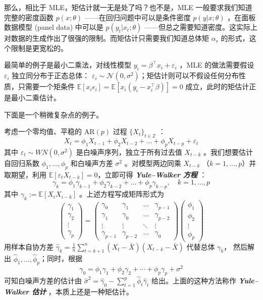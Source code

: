 \begin{remark}
那么，相比于 MLE，矩估计就一无是处了吗？也不是，MLE 一般要求我们知道完整的密度函数 $p(x;\theta)$ ------在回归问题中可以是条件密度 $p(y|x;\theta)$ ，在面板数据模型 (panel data) 中可以是 $p(y_t|x_t;\theta)$ ------但总之需要知道密度。这实际上对数据的生成作出了很强的限制。而矩估计只需要我们知道总体矩 $\alpha_r$ 的形式，这个限制是更宽松的。

最简单的例子是最小二乘法，对线性模型 $y_i=\beta^\top x_i+\varepsilon_i$ ，MLE 的做法需要假设 $\varepsilon_i$ 独立同分布于正态总体： $\varepsilon_i \sim \mathcal{N}(0,\sigma^2)$；矩估计则可以不假设任何分布性质，只需要一个矩条件 $\mathbb{E}[x_i\epsilon_i]=\mathbb{E}[x_i(y_i-x_i^\top\beta)]=0$ 成立，此时的矩估计正是最小二乘估计。%


下面是一个稍微复杂点的例子。

\begin{example}
考虑一个零均值、平稳的 $\mathrm{AR}(p)$ 过程 $\{X_t\}_{t\in\mathbb Z}$ ：
\[X_t = \phi_1 X_{t-1} + \phi_2 X_{t-2} + \dots + \phi_p X_{t-p} + \varepsilon_t\]
其中 $\varepsilon_t\sim WN(0,\sigma^2)$ 是白噪声序列，独立于所有过去值 $X_{t-k}$ 。我们想要估计自回归系数 $\phi_1, \dots, \phi_p$ 和白噪声方差 $\sigma^2$ 。对模型两边同乘 $X_{t-k}$ （$k=1,\dots,p$）并取期望，利用 $\mathbb{E}[\varepsilon_t X_{t-k}] = 0$，立即可得 \textbf{\emph{Yule--Walker 方程}} ：
\[ \gamma_k = \phi_1 \gamma_{k-1} + \phi_2 \gamma_{k-2} + \dots + \phi_p \gamma_{k-p}, \quad k=1,\dots,p \]其中 $\gamma_k:=\mathbb{E}[X_iX_{i-k}]$ 。上述方程写成矩阵形式为
\[\begin{pmatrix} \gamma_1 \\ \gamma_2 \\ \vdots \\ \gamma_p \end{pmatrix} = \begin{pmatrix} \gamma_0 & \gamma_1 & \dots & \gamma_{p-1} \\ \gamma_1 & \gamma_0 & \dots & \gamma_{p-2} \\ \vdots & \vdots & \ddots & \vdots \\ \gamma_{p-1} & \gamma_{p-2} & \dots & \gamma_0 \end{pmatrix} \begin{pmatrix} \phi_1 \\ \phi_2 \\ \vdots \\ \phi_p \end{pmatrix}\]
用样本自协方差 $\widehat{\gamma}_k = \frac{1}{n}\sum_{t=k+1}^n (X_t - \bar{X})(X_{t-k} - \bar{X})$ 代替总体 $\gamma_k$， 然后解出 $\widehat{\phi}_1,\dots,\widehat{\phi}_p$；同时，根据
\[\gamma_0=\phi_1\gamma_1+\phi_2\gamma_2+\cdots+\phi_p\gamma_p+\sigma^2\]
可知白噪声方差的估计由 $\widehat\sigma^2=\widehat\gamma_0-\sum_{t=1}^p\widehat\phi_t\widehat \gamma_t$ 给出。上面的这种方法称作 \textbf{\emph{Yule--Walker 估计}} ，本质上还是一种矩估计。


\end{example}
\end{remark}
